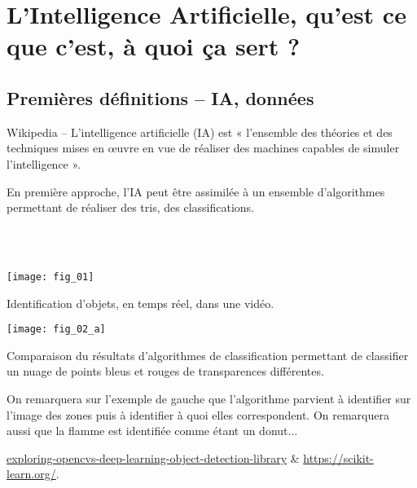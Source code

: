 \def\xxfigures{
}%

\iflivret

\else

\fi
\setlength{\columnseprule}{.1pt}

\vspace{2cm}
\pagestyle{fancy}
\thispagestyle{plain}








\section{L'Intelligence Artificielle, qu'est ce que c'est, à quoi ça sert ?}

\subsection{Premières définitions -- IA, données}
\begin{defi}
Wikipedia -- L'intelligence artificielle (IA) est « l'ensemble des théories et des techniques mises en œuvre en vue de réaliser des machines capables de simuler l'intelligence ». 
\end{defi}

En première approche, l'IA peut être assimilée à un ensemble d'algorithmes permettant de réaliser des tris, des classifications.
\begin{exemple}~\\
\\
\vspace{-1cm}

\begin{multicols}{2}
\begin{center}
\texttt{[image: fig\_01]}
\end{center}
Identification d'objets, en temps réel, dans une vidéo.

\begin{center}
\texttt{[image: fig\_02\_a]}
\end{center}


Comparaison du résultats d'algorithmes de classification permettant de classifier un nuage de points bleus et rouges de transparences différentes.
\end{multicols}

On remarquera sur l'exemple de gauche que l'algorithme parvient à identifier sur l'image des zones puis à identifier à quoi elles correspondent. On remarquera aussi que la flamme est identifiée comme étant un donut...


\begin{flushright}
\footnotesize
\url{exploring-opencvs-deep-learning-object-detection-library} \&  \url{https://scikit-learn.org/}.
\normalsize

\end{flushright}
\end{exemple}




